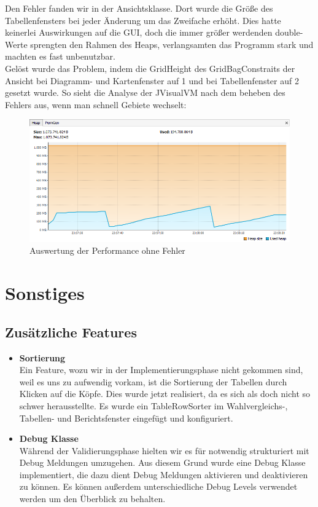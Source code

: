 \documentclass[12pt,a4paper,titlepage]{article}
\begin{document}
Den Fehler fanden wir in der Ansichtsklasse. Dort wurde die Größe des Tabellenfensters bei jeder Änderung um das Zweifache erhöht. Dies hatte keinerlei Auswirkungen auf die GUI, doch die immer größer werdenden double-Werte sprengten den Rahmen des Heaps, verlangsamten das Programm stark und machten es fast unbenutzbar.\\
Gelöst wurde das Problem, indem die GridHeight des GridBagConstraits der Ansicht bei Diagramm- und Kartenfenster auf 1 und bei Tabellenfenster auf 2 gesetzt wurde. So sieht die Analyse der JVisualVM nach dem beheben des Fehlers aus, wenn man schnell Gebiete wechselt:\\
\begin{figure}[!ht]
\centering
\includegraphics[scale=0.7]{ohneFehler.png} \caption{Auswertung der Performance ohne Fehler}
\end{figure}

\section{Sonstiges}

\subsection{Zusätzliche Features}
\begin{itemize}
\item{\bf{Sortierung}}\\
Ein Feature, wozu wir in der Implementierungsphase nicht gekommen sind, weil es uns zu aufwendig vorkam, ist die Sortierung der Tabellen durch Klicken auf die Köpfe. Dies wurde jetzt realisiert, da es sich als doch nicht so schwer herausstellte. Es wurde ein TableRowSorter im Wahlvergleichs-, Tabellen- und Berichtsfenster eingefügt und konfiguriert.\\

\item{\bf{Debug Klasse}}\\
Während der Validierungsphase hielten wir es für notwendig strukturiert mit Debug Meldungen umzugehen. Aus diesem Grund wurde eine Debug Klasse implementiert, die dazu dient Debug Meldungen aktivieren und deaktivieren zu können. Es können außerdem unterschiedliche Debug Levels verwendet werden um den Überblick zu behalten.

\end{itemize}
\end{document}
